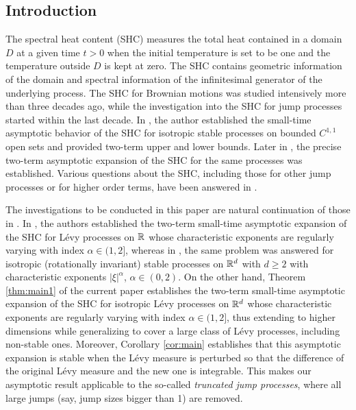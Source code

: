 \documentclass[11pt]{article}
\begin{document}
\begin{doublespace}
\section{Introduction}\label{section:introduction}

The spectral heat content (SHC) measures the total heat contained in a domain $D$ at a given time $t>0$ when the initial temperature is set to be one and the temperature outside $D$ is kept at zero.
The SHC contains geometric information of the domain and spectral information of the infinitesimal generator of the underlying process. 
The SHC for Brownian motions was studied intensively more than three decades ago, while the investigation into the SHC for jump processes started within the last decade. In \cite{Val2016, Val2017}, the author established the small-time asymptotic behavior of the SHC for isotropic stable processes on bounded $C^{1,1}$ open sets and provided two-term upper and lower bounds. Later in \cite{PS22}, the precise two-term asymptotic expansion of the SHC for the same processes was established. 
Various questions about the SHC, including those for other jump processes or for higher order terms, have been answered in \cite{GPS19, KP22, KP23, P21, PS19}. 

The investigations to be conducted in this paper are natural continuation of those in \cite{GPS19, PS22}. In \cite[Theorem 4.2]{GPS19}, the authors established the two-term small-time asymptotic expansion of the SHC for L\'evy processes on ${\mathbb R}$ whose characteristic exponents are regularly varying with index $\alpha\in (1,2]$, whereas in \cite[Theorem 1.1]{PS22}, the same problem was answered for isotropic (rotationally invariant) stable processes on ${\mathbb R}^{d}$ with $d\ge 2$ with characteristic exponents $|\xi|^{\alpha}$, $\alpha\in (0,2)$. On the other hand, 
Theorem \ref{thm:main1} of the current paper establishes the two-term small-time asymptotic expansion of the SHC for isotropic L\'evy processes on ${\mathbb R}^{d}$ whose characteristic exponents are regularly varying with index $\alpha\in (1,2]$, thus extending \cite[Theorem 4.2]{GPS19} to higher dimensions while generalizing \cite[Theorem 1.1]{PS22} to cover a large class of L\'evy processes, including non-stable ones. Moreover, Corollary \ref{cor:main} establishes that this asymptotic expansion is stable when the L\'evy measure is perturbed so that the difference of the original L\'evy measure and the new one is integrable. This makes our asymptotic result applicable to the so-called \textit{truncated jump processes}, where all large jumps (say, jump sizes bigger than 1) are removed. 



\end{doublespace}
\end{document}

